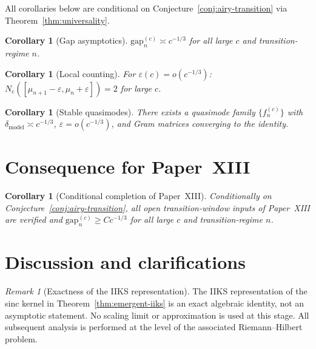 \documentclass[12pt,a4paper]{amsart}
\newtheorem{corollary}[theorem]{Corollary}
\theoremstyle{definition}
\theoremstyle{remark}
\newtheorem{remark}[theorem]{Remark}
\newcommand{\gapc}[2]{\mathrm{gap}_{#2}^{(#1)}}
\begin{document}
All corollaries below are conditional on
Conjecture~\ref{conj:airy-transition} via Theorem~\ref{thm:universality}.

\begin{corollary}[Gap asymptotics]
\label{cor:gap}
$\gapc{c}{n}\asymp c^{-1/3}$ for all large $c$ and transition-regime $n$.
\end{corollary}

\begin{corollary}[Local counting]
\label{cor:counting}
For $\varepsilon(c)=o(c^{-1/3})$:
$N_c([\mu_{n+1}-\varepsilon,\mu_n+\varepsilon])=2$ for large $c$.
\end{corollary}

\begin{corollary}[Stable quasimodes]
\label{cor:quasimodes}
There exists a quasimode family $\{f_n^{(c)}\}$ with
$\delta_{\mathrm{model}}\asymp c^{-1/3}$, $\varepsilon=o(c^{-1/3})$,
and Gram matrices converging to the identity.
\end{corollary}

\section{Consequence for Paper~XIII}
\label{sec:paper13b}

\begin{corollary}[Conditional completion of Paper~XIII]
\label{cor:paper13b}
Conditionally on Conjecture~\ref{conj:airy-transition}, all open
transition-window inputs of Paper~XIII are verified and
$\gapc{c}{n}\ge Cc^{-1/3}$ for all large $c$ and transition-regime $n$.
\end{corollary}

\section{Discussion and clarifications}
\label{sec:discussion}

\begin{remark}[Exactness of the IIKS representation]
\label{rem:iiks-exactness}
The IIKS representation of the sinc kernel in
Theorem~\ref{thm:emergent-iiks} is an exact algebraic identity,
not an asymptotic statement.
No scaling limit or approximation is used at this stage.
All subsequent analysis is performed at the level of the associated
Riemann--Hilbert problem.
\end{remark}
\end{document}
